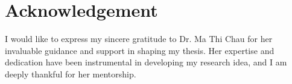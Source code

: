 \section*{Acknowledgement}
\label{sec:acknowledgement}

I would like to express my sincere gratitude to Dr. Ma Thi Chau for her invaluable guidance and support in shaping my thesis. Her expertise and dedication have been instrumental in developing my research idea, and I am deeply thankful for her mentorship.

